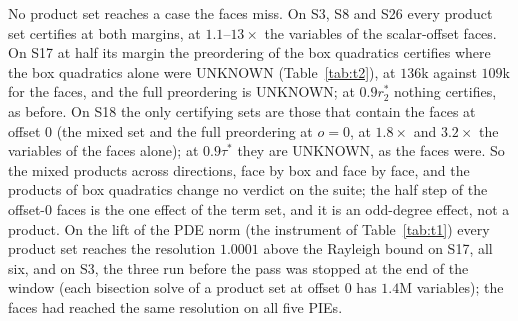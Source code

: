 No product set reaches a case the faces miss. On S3, S8 and S26 every product set certifies at both margins, at $1.1$--$13\times$ the variables of the scalar-offset faces. On S17 at half its margin the preordering of the box quadratics certifies where the box quadratics alone were UNKNOWN (Table~\ref{tab:t2}), at $136$k against $109$k for the faces, and the full preordering is UNKNOWN; at $0.9r_2^*$ nothing certifies, as before. On S18 the only certifying sets are those that contain the faces at offset $0$ (the mixed set and the full preordering at $o=0$, at $1.8\times$ and $3.2\times$ the variables of the faces alone); at $0.9\tau^*$ they are UNKNOWN, as the faces were. So the mixed products across directions, face by box and face by face, and the products of box quadratics change no verdict on the suite; the half step of the offset-$0$ faces is the one effect of the term set, and it is an odd-degree effect, not a product. On the lift of the PDE norm (the instrument of Table~\ref{tab:t1}) every product set reaches the resolution $1.0001$ above the Rayleigh bound on S17, all six, and on S3, the three run before the pass was stopped at the end of the window (each bisection solve of a product set at offset $0$ has $1.4$M variables); the faces had reached the same resolution on all five PIEs.


